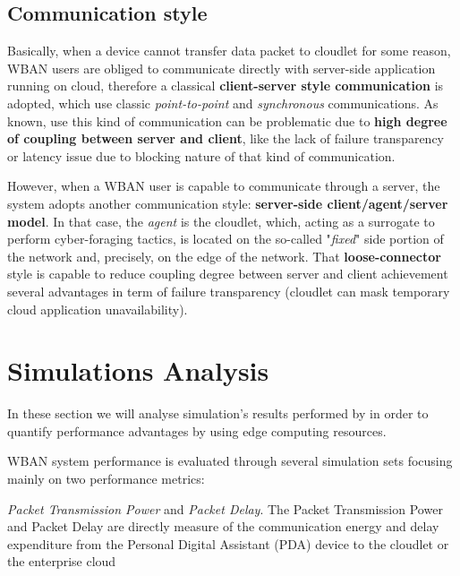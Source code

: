 \documentclass[sigchi]{acmart}
\begin{document}
\subsection{Communication style}

Basically, when a device cannot transfer data packet to cloudlet for some reason, WBAN users are obliged to communicate directly with server-side application running on cloud, therefore a classical \textbf{client-server style communication} is adopted, which use classic \textit{point-to-point} and \textit{synchronous} communications. As known, use this kind of communication can be problematic due to \textbf{high degree of coupling between server and client}, like the lack of failure transparency or latency issue due to blocking nature of that kind of communication.

However, when a WBAN user is capable to communicate through a server, the system adopts another communication style: \textbf{server-side client/agent/server model}. In that case, the \textit{agent} is the cloudlet, which, acting as a surrogate to perform cyber-foraging tactics, is located on the so-called "\textit{fixed}" side portion of the network and, precisely, on the edge of the network. That \textbf{loose-connector} style is capable to reduce coupling degree between server and client achievement several advantages in term of failure transparency (cloudlet can mask temporary cloud application unavailability).

\section{Simulations Analysis}

In these section we will analyse simulation's results performed by \citet{MSAReport} in order to quantify performance advantages by using edge computing resources. 

WBAN system performance is evaluated through several simulation sets focusing mainly on two performance metrics:

\vspace{0.3cm}

\begin{quoting}[font=itshape, begintext={``}, endtext={''\cite[par.~4.2]{MSAReport}}]
\textit{Packet Transmission Power} and \textit{Packet Delay}. The Packet Transmission Power and Packet Delay are directly measure of the communication energy and delay expenditure from the Personal Digital Assistant (PDA) device to the cloudlet or the enterprise cloud
\end{quoting}
\end{document}
